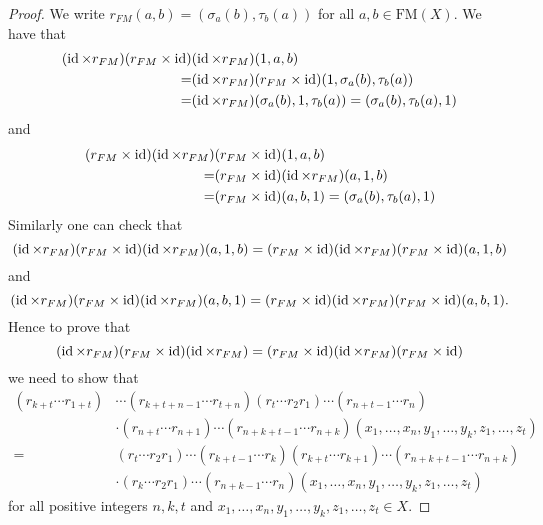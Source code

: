 \begin{proof}
 We write $r_{FM}(a,b)=(\sigma_a(b),\tau_b(a))$ for all $a,b\in \mathrm{FM}(X)$. We have that
\begin{align*}
(\operatorname{id}\times r_{FM})(r_{FM}\times \operatorname{id})&(\operatorname{id}\times r_{FM})(1,a,b)\\
=&(\operatorname{id}\times r_{FM})(r_{FM}\times \operatorname{id})(1,\sigma_a(b),\tau_b(a))\\
=&(\operatorname{id}\times r_{FM})(\sigma_a(b),1,\tau_b(a))=(\sigma_a(b),\tau_b(a),1)
\end{align*}
and
\begin{align*}
(r_{FM}\times \operatorname{id})(\operatorname{id}\times r_{FM})&(r_{FM}\times \operatorname{id})(1,a,b)\\
=&(r_{FM}\times \operatorname{id})(\operatorname{id}\times r_{FM})(a,1,b)\\
=&(r_{FM}\times \operatorname{id})(a,b,1)=(\sigma_a(b),\tau_b(a),1)
\end{align*}
Similarly one can check that
\[(\operatorname{id}\times r_{FM})(r_{FM}\times \operatorname{id})(\operatorname{id}\times r_{FM})(a,1,b)=
(r_{FM}\times \operatorname{id})(\operatorname{id}\times r_{FM})(r_{FM}\times \operatorname{id})(a,1,b)\]
and
\[(\operatorname{id}\times r_{FM})(r_{FM}\times \operatorname{id})(\operatorname{id}\times r_{FM})(a,b,1)=
(r_{FM}\times \operatorname{id})(\operatorname{id}\times r_{FM})(r_{FM}\times \operatorname{id})(a,b,1).\]
Hence
to prove that
\[(\operatorname{id}\times r_{FM})(r_{FM}\times \operatorname{id})(\operatorname{id}\times r_{FM})=(r_{FM}\times \operatorname{id})(\operatorname{id}\times r_{FM})(r_{FM}\times \operatorname{id})\]
we need to show that
\begin{align*}
    (r_{k+t}\cdots r_{1+t})&\cdots (r_{k+t+n-1}\cdots r_{t+n})(r_{t}\cdots r_2r_{1})\cdots (r_{n+t-1}\cdots r_{n})\\
    &\cdot (r_{n+t}\cdots r_{n+1})\cdots (r_{n+k+t-1}\cdots r_{n+k})
    (x_1,\dots ,x_n,y_1,\dots ,y_k,z_1,\dots,z_t)\\
    =&(r_{t}\cdots r_2r_{1})\cdots (r_{k+t-1}\cdots r_{k})(r_{k+t}\cdots r_{k+1})\cdots (r_{n+k+t-1}\cdots r_{n+k})\\
    &\cdot (r_{k}\cdots r_2r_{1})\cdots (r_{n+k-1}\cdots r_{n})(x_1,\dots ,x_n,y_1,\dots ,y_k,z_1,\dots,z_t)
\end{align*}
for all positive integers $n,k,t$ and $x_1,\dots ,x_n,y_1,\dots ,y_k,z_1,\dots ,z_t\in X$.


\end{proof}
